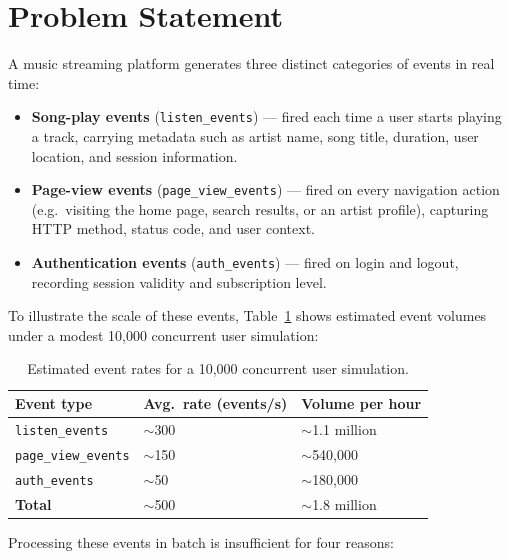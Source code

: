 \section{Problem Statement}

A music streaming platform generates three distinct categories of events in real time:

\begin{itemize}
  \item \textbf{Song-play events} (\texttt{listen\_events}) — fired each time a user starts playing a track, carrying metadata such as artist name, song title, duration, user location, and session information.
  \item \textbf{Page-view events} (\texttt{page\_view\_events}) — fired on every navigation action (e.g.\ visiting the home page, search results, or an artist profile), capturing HTTP method, status code, and user context.
  \item \textbf{Authentication events} (\texttt{auth\_events}) — fired on login and logout, recording session validity and subscription level.
\end{itemize}

To illustrate the scale of these events, Table~\ref{tab:event-rates} shows estimated
event volumes under a modest 10,000 concurrent user simulation:

\begin{table}[H]
  \centering
  \caption{Estimated event rates for a 10,000 concurrent user simulation.}
  \label{tab:event-rates}
  \begin{tabularx}{\textwidth}{lXX}
    \toprule
    \textbf{Event type}        & \textbf{Avg.\ rate (events/s)} & \textbf{Volume per hour} \\
    \midrule
    \texttt{listen\_events}    & $\sim$300                       & $\sim$1.1 million \\
    \texttt{page\_view\_events}& $\sim$150                       & $\sim$540,000 \\
    \texttt{auth\_events}      & $\sim$50                        & $\sim$180,000 \\
    \midrule
    \textbf{Total}             & $\sim$500                       & $\sim$1.8 million \\
    \bottomrule
  \end{tabularx}
\end{table}

Processing these events in batch is insufficient for four reasons:

